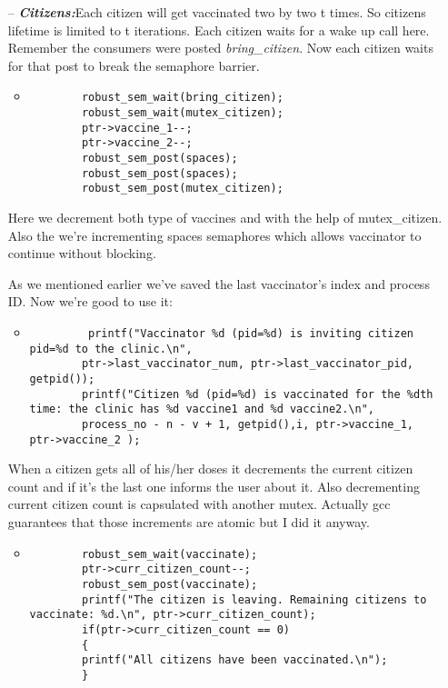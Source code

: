 \documentclass{article}
\begin{document}
\begin{itemize}
\item[--] \textbf{\textit{Citizens:}}Each citizen will get vaccinated two by two t times. So citizens lifetime is limited to t iterations. Each citizen waits for a wake up call here. Remember the consumers were posted \textit{bring\_citizen}. Now each citizen waits for that post to break the semaphore barrier.

\begin{itemize}
    \item 
    \begin{lstlisting}
        robust_sem_wait(bring_citizen);
        robust_sem_wait(mutex_citizen);
        ptr->vaccine_1--;
        ptr->vaccine_2--;
        robust_sem_post(spaces);
        robust_sem_post(spaces);
        robust_sem_post(mutex_citizen);
    \end{lstlisting}
\end{itemize}

\quad Here we decrement both type of vaccines and with the help of mutex\_citizen. Also the we're incrementing spaces semaphores which allows vaccinator to continue without blocking.

\newpage
\quad As we mentioned earlier we've saved the last vaccinator's index and process ID. Now we're good to use it:

\begin{itemize}
    \item 
    \begin{lstlisting}
         printf("Vaccinator %d (pid=%d) is inviting citizen pid=%d to the clinic.\n",
        ptr->last_vaccinator_num, ptr->last_vaccinator_pid, getpid());
        printf("Citizen %d (pid=%d) is vaccinated for the %dth time: the clinic has %d vaccine1 and %d vaccine2.\n",
        process_no - n - v + 1, getpid(),i, ptr->vaccine_1, ptr->vaccine_2 );
    \end{lstlisting}
\end{itemize}

\quad When a citizen gets all of his/her doses it decrements the current citizen count and if it's the last one informs the user about it. Also decrementing current citizen count is capsulated with another mutex. Actually gcc guarantees that those increments are atomic but I did it anyway.

\begin{itemize}
    \item 
    \begin{lstlisting}
        robust_sem_wait(vaccinate);
        ptr->curr_citizen_count--;
        robust_sem_post(vaccinate);
        printf("The citizen is leaving. Remaining citizens to vaccinate: %d.\n", ptr->curr_citizen_count);
        if(ptr->curr_citizen_count == 0)
        {
        printf("All citizens have been vaccinated.\n");
        }
    \end{lstlisting}
\end{itemize}


\end{itemize}
\end{document}
